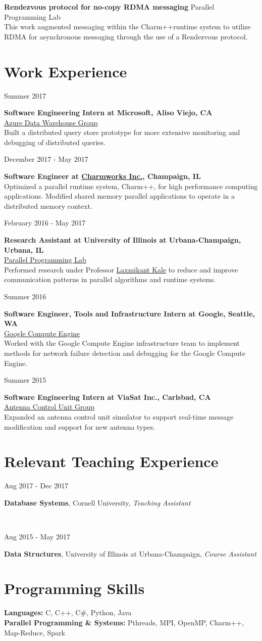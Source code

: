 \documentclass[10pt]{article}
\newcommand{\leftrightrow}[2]{
	#1 \hfill #2 \\
}
\newcommand{\teachblock}[2]{
\begin{minipage}[t]{0.20\textwidth}
\vspace*{0.4em}
\begin{flushright}#2\end{flushright}
\end{minipage}
\hfill\vline\hfill
\begin{minipage}[t]{0.76\textwidth}
\vspace*{0.4em}
	#1
\end{minipage}
\vspace{0.2em}
}
\newcommand{\workblock}[4]{
\begin{minipage}[t]{0.14\textwidth}
\vspace*{0.4em}
\begin{flushright}#3\end{flushright}
\end{minipage}
\hfill\vline\hfill
\begin{minipage}[t]{0.82\textwidth}
\vspace*{0.4em}
	\textbf{#1} \\
	#2 \\
    #4
\end{minipage}
\vspace{0.7em}
}
\newcommand{\workblocktwo}[3]{
\begin{minipage}[t]{0.14\textwidth}
\vspace*{0.4em}
\begin{flushright}#2\end{flushright}
\end{minipage}
\hfill\vline\hfill
\begin{minipage}[t]{0.82\textwidth}
\vspace*{0.4em}
	\textbf{#1} \\
    #3
\end{minipage}
\vspace{0.7em}
}
\newcommand{\researchblock}[3]{
	\leftrightrow{\textbf{#1}}{#2}#3
}
\begin{document}
\vspace{0.6em}

\researchblock{Rendezvous protocol for no-copy RDMA messaging}{Parallel Programming Lab}{
	This work augmented messaging within the Charm++\footnotemark[1] runtime system to utilize RDMA for asynchronous messaging through the use of a Rendezvous protocol. 
}

\section{Work Experience}
\vspace{-0.4em}
\workblock{Software Engineering Intern at Microsoft, Aliso Viejo, CA}{\href{https://azure.microsoft.com/en-us/services/sql-data-warehouse/}{Azure Data Warehouse Group}}{Summer 2017}{Built a distributed query store prototype for more extensive monitoring and debugging of distributed queries.} 

\workblocktwo{Software Engineer at \href{http://www.charmplusplus.com/}{Charmworks Inc.}, Champaign, IL}{December 2017 - May 2017}{Optimized a parallel
runtime system, Charm++\footnotemark[1], for high performance computing applications. Modified shared memory parallel applications to operate in a distributed memory context.} 

\workblock{Research Assistant at University of Illinois at Urbana-Champaign, Urbana, IL}{\href{http://charm.cs.uiuc.edu/}{Parallel Programming Lab}}{February 2016 - May 2017}{Performed research under Professor \href{http://charm.cs.uiuc.edu/~kale/}{Laxmikant Kale} to reduce and improve communication patterns in parallel algorithms and runtime systems.}

\workblock{Software Engineer, Tools and Infrastructure Intern at Google, Seattle, WA}{\href{https://cloud.google.com/compute/}{Google Compute Engine}}{Summer 2016}{Worked with the Google Compute Engine infrastructure team to implement methods for network failure detection and debugging for the Google Compute Engine.}

\workblock{Software Engineering Intern at ViaSat Inc., Carlsbad, CA}{\href{https://www.viasat.com/products/antenna-controllers}{Antenna Control Unit Group}}{Summer 2015}{Expanded an antenna control unit simulator to support real-time message modification and support for new antenna types.}

\vspace{-0.4em}

\section{Relevant Teaching Experience}
\vspace{-0.8em}
\teachblock{\textbf{Database Systems}, Cornell University, \textit{Teaching Assistant}}{Aug 2017 - Dec 2017} \\
\teachblock{\textbf{Data Structures}, University of Illinois at Urbana-Champaign, \textit{Course Assistant}}{Aug 2015 - May 2017}

\vspace{-0.44em}

\section{Programming Skills}
\vspace{0.1em}
\textbf{Languages:} C, C++, C\#, Python, Java \\
\textbf{Parallel Programming \& Systems:} Pthreads, MPI, OpenMP, Charm++, Map-Reduce, Spark
\end{document}
